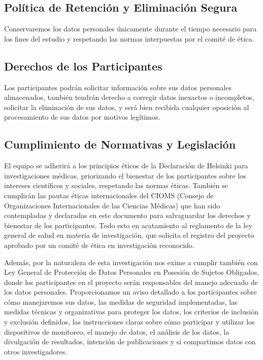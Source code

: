 \subsection{Política de Retención y Eliminación Segura}
\label{subsec:politica_retencion}

Conservaremos los datos personales únicamente durante el tiempo necesario para los fines del estudio y respetando las normas interpuestas por el comité de ética.

\subsection{Derechos de los Participantes}
\label{subsec:derechos_participantes}

Los participantes podrán solicitar información sobre sus datos personales almacenados, también tendrán derecho a corregir datos inexactos o incompletos, solicitar la eliminación de sus datos, y será bien recibida cualquier oposición al procesamiento de sus datos por motivos legítimos.

\subsection{Cumplimiento de Normativas y Legislación}
\label{subsec:cumplimiento_normativas}

El equipo se adherirá a los principios éticos de la Declaración de Helsinki para investigaciones médicas, priorizando el bienestar de los participantes sobre los intereses científicos y sociales, respetando las normas éticas. También se cumplirán las pautas éticas internacionales del CIOMS (Consejo de Organizaciones Internacionales de las Ciencias Médicas) que han sido contempladas y declaradas en este documento para salvaguardar los derechos y bienestar de los participantes. Todo esto en acatamiento al reglamento de la ley general de salud en materia de investigación, que solicita el registro del proyecto aprobado por un comité de ética en investigación reconocido.

Además, por la naturaleza de esta investigación nos exime a cumplir también con Ley General de Protección de Datos Personales en Posesión de Sujetos Obligados, donde los participantes en el proyecto serán responsables del manejo adecuado de los datos personales. Proporcionamos un aviso detallado a los participantes sobre cómo manejaremos sus datos, las medidas de seguridad implementadas, las medidas técnicas y organizativas para proteger los datos, los criterios de inclusión y exclusión definidos, las instrucciones claras sobre cómo participar y utilizar los dispositivos de monitoreo, el manejo de datos, el análisis de los datos, la divulgación de resultados, intención de publicaciones y si compartimos datos con otros investigadores.

